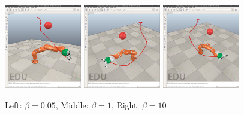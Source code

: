 \documentclass{article}
\begin{document}
\begin{figure}
  \centering
  \includegraphics[width=0.3\textwidth]{images/p2-2-1.png} \hspace{1em}
  \includegraphics[width=0.3\textwidth]{images/p2-2-2.png} \hspace{1em}
  \includegraphics[width=0.3\textwidth]{images/p2-2-3.png}
  \caption{Left: $\beta = 0.05$, Middle: $\beta = 1$, Right: $\beta = 10$}
  \label{fig:p2-2}
\end{figure}

\subsection{}
\end{document}
